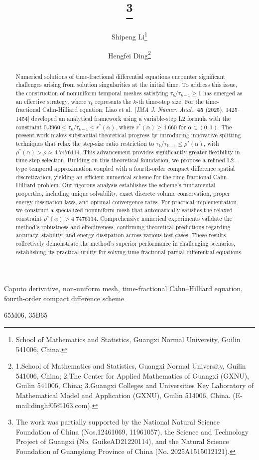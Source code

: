\documentclass{siamart171218}
\title{{\TheTitle}\thanks{The work was partially supported by
the National Natural Science Foundation of China
 (Nos.12461069, 11961057), the Science and Technology Project
of Guangxi (No. GuikeAD21220114), and
the Natural Science Foundation of Guangdong Province
of China (No. 2025A1515012121).}}
\author{
Shipeng Li\thanks{School of Mathematics and Statistics,
Guangxi Normal University, Guilin 541006, China.}
\and
Hengfei Ding\thanks{1.School of Mathematics and Statistics,
 Guangxi Normal University, Guilin 541006, China;
2.The Center for Applied
Mathematics of Guangxi (GXNU), Guilin 541006, China;
3.Guangxi Colleges and Universities Key Laboratory of
Mathematical Model and Application (GXNU),
 Guilin 514006, China. (E-mail:dinghf05@163.com).}}
\theoremstyle{remark}
\theoremstyle{example}
\numberwithin{equation}{section}
\begin{document}
\maketitle
\begin{abstract}
Numerical solutions of time-fractional differential equations encounter significant challenges arising from solution singularities at the initial time. To address this issue, the construction of nonuniform temporal meshes satisfying $\tau_k/\tau_{k-1} \geq 1$ has emerged as an effective strategy, where $\tau_k$ represents the $k$-th time-step size. For the time-fractional Cahn-Hilliard equation, Liao et al.~[\textit{IMA J. Numer. Anal.}, \textbf{45} (2025), 1425--1454] developed an analytical framework using a variable-step L2 formula with the constraint $0.3960 \leq \tau_k/\tau_{k-1} \leq r^*(\alpha)$, where $r^*(\alpha) \geq 4.660$ for $\alpha \in (0,1)$.
The present work makes substantial theoretical progress by introducing innovative splitting techniques that relax the step-size ratio restriction to $\tau_k/\tau_{k-1} \leq \rho^*(\alpha)$, with $\rho^*(\alpha) > \overline{\rho} \approx 4.7476114$. This advancement provides significantly greater flexibility in time-step selection. Building on this theoretical foundation, we propose a refined L2-type temporal approximation coupled with a fourth-order compact difference spatial discretization, yielding an efficient numerical scheme for the time-fractional Cahn-Hilliard problem. Our rigorous analysis establishes the scheme's fundamental properties, including unique solvability, exact discrete volume conservation, proper energy dissipation laws, and optimal convergence rates.
For practical implementation, we construct a specialized nonuniform mesh that automatically satisfies the relaxed constraint $\rho^*(\alpha) > 4.7476114$. Comprehensive numerical experiments validate the method's robustness and effectiveness, confirming theoretical predictions regarding accuracy, stability, and energy dissipation across various test cases. These results collectively demonstrate the method's superior performance in challenging scenarios, establishing its practical utility for solving time-fractional partial differential equations.
\end{abstract}

\begin{keywords}
Caputo derivative, non-uniform mesh,
time-fractional Cahn--Hilliard equation,
fourth-order compact difference scheme
\end{keywords}

\begin{AMS}
65M06, 35B65
\end{AMS}
\end{document}
